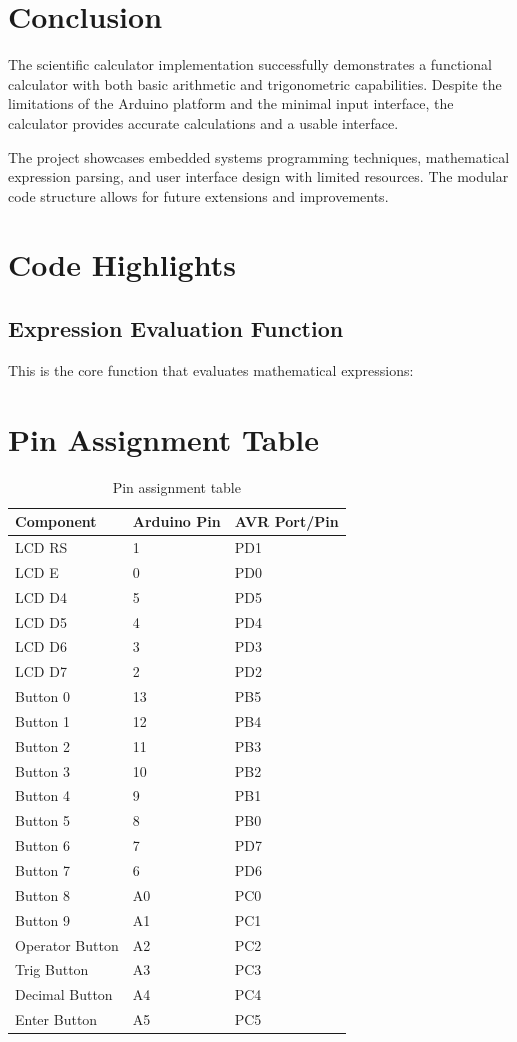 \documentclass[12pt,a4paper]{article}
\begin{document}
\section{Conclusion}
The scientific calculator implementation successfully demonstrates a functional calculator with both basic arithmetic and trigonometric capabilities. Despite the limitations of the Arduino platform and the minimal input interface, the calculator provides accurate calculations and a usable interface.

The project showcases embedded systems programming techniques, mathematical expression parsing, and user interface design with limited resources. The modular code structure allows for future extensions and improvements.

\appendix
\section{Code Highlights}
\subsection{Expression Evaluation Function}
This is the core function that evaluates mathematical expressions:
\section{Pin Assignment Table}
\begin{table}[h]
\centering
\begin{tabular}{|l|l|l|}
\hline
\textbf{Component} & \textbf{Arduino Pin} & \textbf{AVR Port/Pin} \\
\hline
LCD RS & 1 & PD1 \\
\hline
LCD E & 0 & PD0 \\
\hline
LCD D4 & 5 & PD5 \\
\hline
LCD D5 & 4 & PD4 \\
\hline
LCD D6 & 3 & PD3 \\
\hline
LCD D7 & 2 & PD2 \\
\hline
Button 0 & 13 & PB5 \\
\hline
Button 1 & 12 & PB4 \\
\hline
Button 2 & 11 & PB3 \\
\hline
Button 3 & 10 & PB2 \\
\hline
Button 4 & 9 & PB1 \\
\hline
Button 5 & 8 & PB0 \\
\hline
Button 6 & 7 & PD7 \\
\hline
Button 7 & 6 & PD6 \\
\hline
Button 8 & A0 & PC0 \\
\hline
Button 9 & A1 & PC1 \\
\hline
Operator Button & A2 & PC2 \\
\hline
Trig Button & A3 & PC3 \\
\hline
Decimal Button & A4 & PC4 \\
\hline
Enter Button & A5 & PC5 \\
\hline
\end{tabular}
\caption{Pin assignment table}
\end{table}
\end{document}
